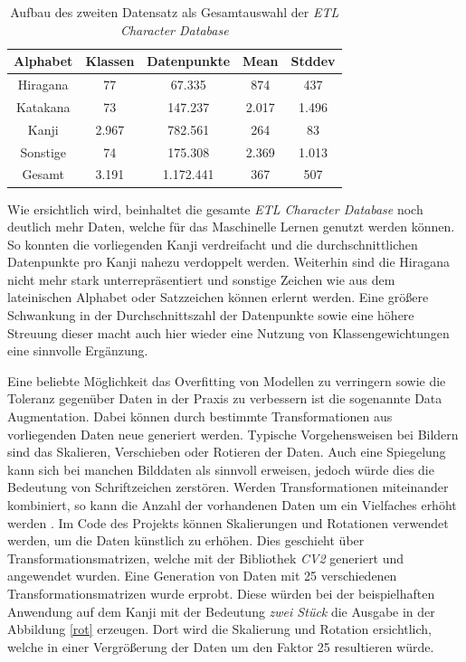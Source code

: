 \documentclass[twoside,a4paper]{IEEEtran}
\begin{document}
\begin{table}[!htb]
	\caption{Aufbau des zweiten Datensatz als Gesamtauswahl der \emph{ETL Character Database}}
	\label{data_total}
	\centering
	\begin{tabular}{|c|c|c|c|c|}
		\hline
		Alphabet & Klassen & Datenpunkte & Mean & Stddev\\
		\hline
		\hline
		Hiragana & 77 & 67.335 & 874 & 437\\
		\hline 
		Katakana & 73 & 147.237 & 2.017 & 1.496\\
		\hline
		Kanji & 2.967 & 782.561 & 264 & 83\\
		\hline
		Sonstige & 74 & 175.308 & 2.369 & 1.013\\
		\hline
		\hline
		Gesamt & 3.191 & 1.172.441 & 367 & 507\\
		\hline
	\end{tabular}
\end{table}
Wie ersichtlich wird, beinhaltet die gesamte \emph{ETL Character Database} noch deutlich mehr Daten, welche für das Maschinelle Lernen genutzt werden können. So konnten die vorliegenden Kanji verdreifacht und die durchschnittlichen Datenpunkte pro Kanji nahezu verdoppelt werden. Weiterhin sind die Hiragana nicht mehr stark unterrepräsentiert und sonstige Zeichen wie aus dem lateinischen Alphabet oder Satzzeichen können erlernt werden. Eine größere Schwankung in der Durchschnittszahl der Datenpunkte sowie eine höhere Streuung dieser macht auch hier wieder eine Nutzung von Klassengewichtungen eine sinnvolle Ergänzung.

Eine beliebte Möglichkeit das Overfitting von Modellen zu verringern sowie die Toleranz gegenüber Daten in der Praxis zu verbessern ist die sogenannte Data Augmentation. Dabei können durch bestimmte Transformationen aus vorliegenden Daten neue generiert werden. Typische Vorgehensweisen bei Bildern sind das Skalieren, Verschieben oder Rotieren der Daten. Auch eine Spiegelung kann sich bei manchen Bilddaten als sinnvoll erweisen, jedoch würde dies die Bedeutung von Schriftzeichen zerstören. Werden Transformationen miteinander kombiniert, so kann die Anzahl der vorhandenen Daten um ein Vielfaches erhöht werden \cite[S.311]{MACHINE_LEARNING}. Im Code des Projekts können Skalierungen und Rotationen verwendet werden, um die Daten künstlich zu erhöhen. Dies geschieht über Transformationsmatrizen, welche mit der Bibliothek \emph{CV2} generiert und angewendet wurden. Eine Generation von Daten mit 25 verschiedenen Transformationsmatrizen wurde erprobt. Diese würden bei der beispielhaften Anwendung auf dem Kanji mit der Bedeutung \textit{zwei Stück} die Ausgabe in der Abbildung \ref{rot} erzeugen. Dort wird die Skalierung und Rotation ersichtlich, welche in einer Vergrößerung der Daten um den Faktor 25 resultieren würde.
\end{document}
